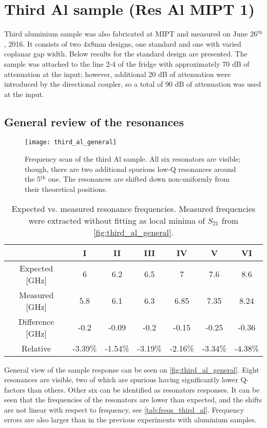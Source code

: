 \documentclass[12pt]{article}
\numberwithin{equation}{section}
\numberwithin{figure}{section}
\begin{document}
\section{Third Al sample (Res Al MIPT 1)}

Third aluminium sample was also fabricated at MIPT and measured on June 26$^\text{th}$, 2016. It consists of two 4x8mm designs, one standard and one with varied coplanar gap width. Below results for the standard design are presented. The sample was attached to the line 2-4 of the fridge with approximately 70 dB of attenuation at the input; however, additional 20 dB of attenuation were introduced by the directional coupler, so a total of 90 dB of attenuation was used at the input.

\subsection{General review of the resonances}

\begin{figure}[h]
\centering
\texttt{[image: third\_al\_general]}
\caption{Frequency scan of the third Al sample. All six resonators are visible; though, there are two additional spurious low-Q resonances around the 5$^\text{th}$ one. The resonances are shifted down non-uniformly from their theoretical positions.}
\label{fig:third_al_general}
\end{figure}

\begin{table}[h]
\centering
\bgroup
\def\arraystretch{1.5}%
\begin{tabular}{c|*{6}{c}}
  & I & II & III & IV & V & VI\\
\hline
Expected [GHz]& 6 & 6.2 & 6.5 & 7 & 7.6 & 8.6 \\
Measured [GHz] & 5.8 &  6.1 & 6.3 & 6.85 &  7.35 &  8.24 \\
Difference [GHz]&  -0.2 & -0.09& -0.2 & -0.15& -0.25& -0.36 \\
Relative & -3.39\%& -1.54\%& -3.19\%& -2.16\%& -3.34\%& -4.38\%
\end{tabular}
\egroup
\caption{Expected vs. measured resonance frequencies. Measured frequencies were extracted without fitting as local minima of $S_{21}$ from \autoref{fig:third_al_general}.}
\label{tab:freqs_third_al}
\end{table}

General view of the sample response can be seen on \autoref{fig:third_al_general}. Eight resonances are visible, two of which are spurious having significantly lower Q-factors than others. Other six can be identified as resonators responses. It can be seen that the frequencies of the resonators are lower than expected, and the shifts are not linear with respect to frequency, see \autoref{tab:freqs_third_al}. Frequency errors are also larger than in the previous experiments with aluminium samples.
\end{document}
